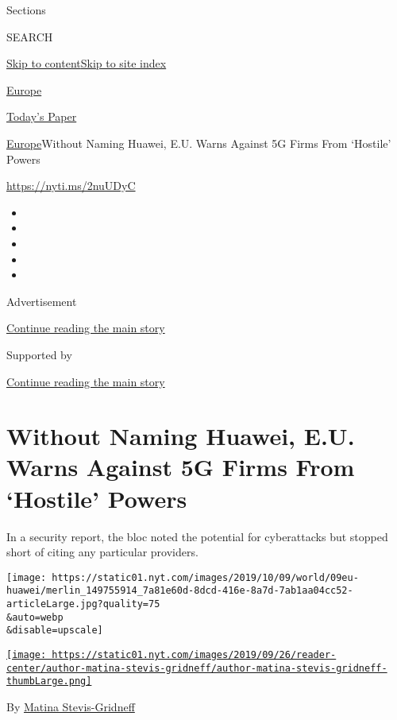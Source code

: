 Sections

SEARCH

\protect\hyperlink{site-content}{Skip to
content}\protect\hyperlink{site-index}{Skip to site index}

\href{https://www.nytimes.com/section/world/europe}{Europe}

\href{https://myaccount.nytimes.com/auth/login?response_type=cookie\&client_id=vi}{}

\href{https://www.nytimes.com/section/todayspaper}{Today's Paper}

\href{/section/world/europe}{Europe}\textbar{}Without Naming Huawei,
E.U. Warns Against 5G Firms From `Hostile' Powers

\url{https://nyti.ms/2nuUDyC}

\begin{itemize}
\item
\item
\item
\item
\item
\end{itemize}

Advertisement

\protect\hyperlink{after-top}{Continue reading the main story}

Supported by

\protect\hyperlink{after-sponsor}{Continue reading the main story}

\hypertarget{without-naming-huawei-eu-warns-against-5g-firms-from-hostile-powers}{%
\section{Without Naming Huawei, E.U. Warns Against 5G Firms From
`Hostile'
Powers}\label{without-naming-huawei-eu-warns-against-5g-firms-from-hostile-powers}}

In a security report, the bloc noted the potential for cyberattacks but
stopped short of citing any particular providers.

\texttt{[image: https://static01.nyt.com/images/2019/10/09/world/09eu-huawei/merlin\_149755914\_7a81e60d-8dcd-416e-8a7d-7ab1aa04cc52-articleLarge.jpg?quality=75\\\&auto=webp\\\&disable=upscale]}

\href{https://www.nytimes.com/by/matina-stevis-gridneff}{\texttt{[image: https://static01.nyt.com/images/2019/09/26/reader-center/author-matina-stevis-gridneff/author-matina-stevis-gridneff-thumbLarge.png]}}

By \href{https://www.nytimes.com/by/matina-stevis-gridneff}{Matina
Stevis-Gridneff}

